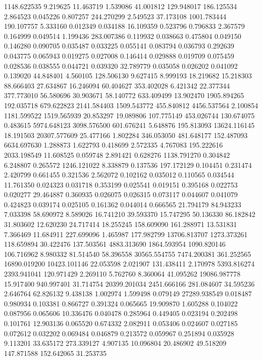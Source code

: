 1148.622535
9.219625
11.463719
1.539086
41.001812
129.948017
186.125534
2.864523
0.045226
0.807257
244.270299
2.549523
37.173108
1001.783444
190.107757
5.333160
0.012349
0.034188
16.109359
0.523796
0.796833
2.367579
0.164999
0.049514
1.199436
283.007386
0.119932
0.038663
0.475804
0.049150
0.146280
0.090705
0.035487
0.033225
0.055141
0.083794
0.036793
0.292639
0.043775
0.065943
0.019275
0.027008
0.146414
0.029888
0.019709
0.075459
0.028536
0.038555
0.044721
0.039320
32.789779
0.035058
0.026202
0.041092
0.139020
44.848401
4.560105
128.506130
9.627415
8.999193
18.219682
15.218303
88.666403
27.634867
16.246094
60.404627
353.402028
6.421342
22.377344
377.773010
56.580696
30.903671
58.140772
633.409499
13.902470
1905.894265
192.035718
679.622823
2141.584403
1509.543772
455.840812
4456.537564
2.100854
1181.599522
1519.565939
20.853297
19.089806
107.775149
453.026744
130.674075
0.483615
5974.648123
3098.576500
601.676241
5.648876
195.813093
13624.116145
18.191503
20307.577609
25.477166
1.802284
346.053050
481.648177
152.487093
6634.697630
1.288873
1.622793
0.418699
2.572335
4.767083
195.222616
2033.198549
11.608525
0.059748
2.891421
0.628276
1138.791270
0.304842
6.248807
0.265572
1246.121022
8.338879
0.137536
197.172129
0.104451
0.231474
2.420799
0.661455
0.321536
2.562072
0.102162
0.035012
0.110565
0.034544
11.761350
0.024323
0.031718
0.353199
0.025541
0.019151
0.395168
0.022753
0.020277
29.464887
0.360935
0.026075
0.026315
0.073117
0.044607
0.041079
0.424823
0.039174
0.025105
0.161362
0.044014
0.666565
21.794179
84.943233
7.033398
58.690972
8.589026
16.741210
39.593370
15.747295
50.136330
86.182842
31.803602
12.620230
24.717414
18.255245
158.609090
161.288971
13.531831
7.366469
11.684911
227.699096
1.465987
177.982799
13706.813707
1273.373261
118.659894
30.422476
137.503561
4883.313690
1864.593954
1090.820146
106.716962
8.980332
81.514540
58.396558
30565.554755
7474.200381
361.252565
16890.019200
10423.101146
22.053598
2.021907
131.438411
2.170978
5393.816274
2393.941041
120.971429
2.269110
5.762760
8.360064
41.095262
19086.987778
15.917400
940.997401
31.714754
20399.201034
2451.666166
281.084607
34.595236
2.646764
62.826132
9.438138
1.002974
1.599498
0.079149
27289.938549
0.018487
0.980934
0.103381
0.866727
0.391324
0.065665
19.909870
1.605288
0.104022
0.087956
0.065606
10.336476
0.040478
0.285964
0.449405
0.023194
0.202498
0.101761
12.903136
0.065520
0.674332
2.082911
0.053406
0.024607
0.027185
0.072612
0.032202
0.069484
0.046879
0.213572
0.059967
0.251894
0.035928
9.113201
33.635172
273.339127
4.907135
10.096804
20.486902
49.518209
147.871588
152.642065
31.253735
